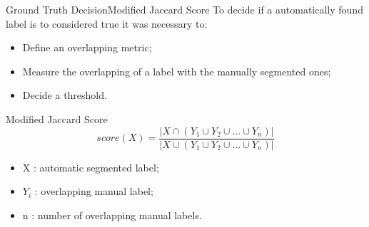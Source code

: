 \documentclass[]{standalone}
\begin{document}
	\begin{frame}{Ground Truth Decision}{Modified Jaccard Score}
	\vspace{-25pt}
	\small
	To decide if a automatically found label is to considered true it was necessary to:
	\begin{itemize}
		\item Define an overlapping metric;
		\item Measure the overlapping of a label with the manually segmented ones;
		\item Decide a threshold.
	\end{itemize}
	
	\begin{block}{Modified Jaccard Score}
		\begin{equation*}
		    score(X) = \frac{|X \cap (Y_1 \cup Y_2 \cup ... \cup Y_n)|}
		    {|X \cup (Y_1 \cup Y_2 \cup ... \cup Y_n)|}
		\end{equation*}
		
		\tiny
		\begin{itemize}
			\item X : automatic segmented label;
			\item $Y_i$ : overlapping manual label;
			\item n : number of overlapping manual labels.
		\end{itemize}
	\end{block}
	\end{frame}
\end{document}
